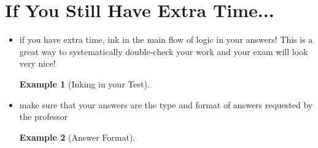 \documentclass[a4paper]{article}
\theoremstyle{example}
\newtheorem{example}{Example}
\begin{document}
\section{If You Still Have Extra Time...}
\begin{itemize}
    \item if you have extra time, ink in the main flow of logic in your answers! This is a great way to systematically double-check your work and your exam will look very nice!
    	\begin{example}[Inking in your Test]
   		\end{example}
    \item make sure that your answers are the type and format of answers requested by the professor
    \begin{example}[Answer Format]
   	\end{example}
\end{itemize}
\end{document}
